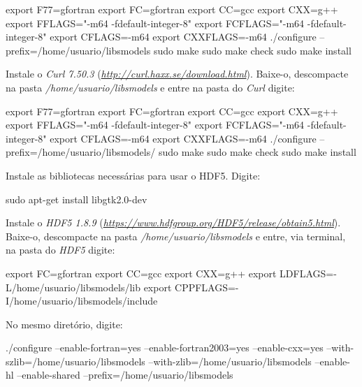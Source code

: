 \begin{bashcode}
export F77=gfortran
export FC=gfortran
export CC=gcc
export CXX=g++
export FFLAGS="-m64 -fdefault-integer-8"
export FCFLAGS="-m64 -fdefault-integer-8"
export CFLAGS=-m64
export CXXFLAGS=-m64
./configure --prefix=/home/usuario/libsmodels
sudo make
sudo make check
sudo make install
\end{bashcode}
\bigskip

\noindent Instale o \textit{Curl 7.50.3} (\textcolor{bleu_cite}{\href{http://curl.haxx.se/download.html}{\textit{http://curl.haxx.se/download.html}}}). Baixe-o, descompacte na pasta \textit{/home/usuario/libsmodels} e entre na pasta do \textit{Curl} digite:
\bigskip

\begin{bashcode}
export F77=gfortran
export FC=gfortran
export CC=gcc
export CXX=g++
export FFLAGS="-m64 -fdefault-integer-8"
export FCFLAGS="-m64 -fdefault-integer-8"
export CFLAGS=-m64
export CXXFLAGS=-m64
./configure --prefix=/home/usuario/libsmodels/
sudo make
sudo make check
sudo make install
\end{bashcode}
\bigskip

\noindent Instale as bibliotecas necessárias para usar o HDF5. Digite:
\bigskip

\begin{bashcode}
sudo apt-get install libgtk2.0-dev
\end{bashcode}
\bigskip

\noindent Instale o \textit{HDF5 1.8.9} (\textcolor{bleu_cite}{\href{https://www.hdfgroup.org/HDF5/release/obtain5.html}{\textit{https://www.hdfgroup.org/HDF5/release/obtain5.html}}}). Baixe-o, descompacte na pasta \textit{/home/usuario/libsmodels} e entre, via terminal, na pasta do \textit{HDF5} digite:
\bigskip

\begin{bashcode}
export FC=gfortran
export CC=gcc
export CXX=g++
export LDFLAGS=-L/home/usuario/libsmodels/lib
export CPPFLAGS=-I/home/usuario/libsmodels/include
\end{bashcode}
\bigskip

\noindent No mesmo diretório, digite:
\bigskip

\begin{bashcode}[fontsize=\footnotesize]
./configure --enable-fortran=yes --enable-fortran2003=yes --enable-cxx=yes
--with-szlib=/home/usuario/libsmodels --with-zlib=/home/usuario/libsmodels --enable-hl
--enable-shared --prefix=/home/usuario/libsmodels
\end{bashcode}
\bigskip


